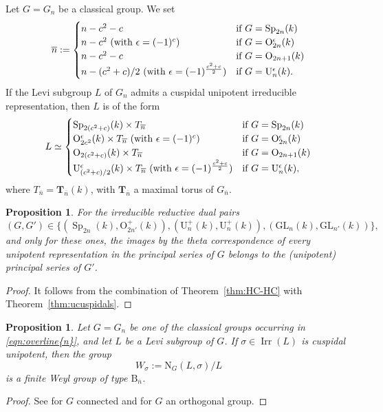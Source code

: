 \documentclass[12pt]{amsart}
\numberwithin{equation}{subsection}
\newtheorem{prop}[equation]{Proposition}
\newcommand{\rU}{\mathrm{U}}
\newcommand{\bT}{\mathbf{T}}
\newcommand{\Irr}{\operatorname{Irr}}
\newcommand{\rN}{{\mathrm{N}}}
\newcommand{\GL}{\mathrm{GL}}
\newcommand{\Sp}{\operatorname{Sp}}
\def\rO{{\mathrm{O}}}
\def\rB{{\mathrm{B}}}
\begin{document}
Let $G=G_n$ be a classical group. We set
\begin{equation} \label{eqn:overline{n}}
\overline{n}:=
\begin{cases}
n-c^2-c&\text{if $G=\Sp_{2n}(k)$}\cr
n-c^2 \text{ (with $\epsilon=(-1)^c$)}&\text{if $G=\rO_{2n}^\epsilon(k)$}\cr
n-c^2-c&\text{if $G=\rO_{2n+1}(k)$}\cr
n-(c^2+c)/2 \text{ (with $\epsilon=(-1)^{\frac{c^2+c}{2}}$)} &\text{if $G=\rU_{n}^\epsilon(k)$}.
\end{cases} 
\end{equation}
If the Levi subgroup $L$ of $G_n$ admits a cuspidal unipotent irreducible representation, then $L$ is of the form
\begin{equation} \label{eqn:Levi-form}
L\simeq
\begin{cases}
\Sp_{2(c^2+c)}(k)\times T_{\overline{n}}&\text{if $G=\Sp_{2n}(k)$}\cr
\rO^\epsilon_{2c^2}(k)\times T_{\overline{n}} \text{ (with $\epsilon=(-1)^c$)}&\text{if $G=\rO_{2n}^\epsilon(k)$}\cr
\rO_{2(c^2+c)}(k)\times T_{\overline{n}}&\text{if $G=\rO_{2n+1}(k)$}\cr
\rU^\epsilon_{(c^2+c)/2}(k)\times T_{\overline{n}}\text{ (with $\epsilon=(-1)^{\frac{c^2+c}{2}}$)} &\text{if $G=\rU^\epsilon_{n}(k)$},
\end{cases} 
\end{equation}
where $T_{\overline{n}}=\bT_{\overline{n}}(k)$, with $\bT_{\overline{n}}$ a maximal torus of $G_{\overline{n}}$.

\begin{prop} \label{pro:principal-unipotent}
For the  irreducible reductive dual pairs 
\[(G,G')\in\{(\Sp_{2n}(k),\rO_{2n'}^+(k)),(\rU_{n}^+(k),\rU_{n}^+(k)),(\GL_n(k),\GL_{n'}(k))\},\] 
and only for these ones,  the images by the theta correspondence of every unipotent representation in the principal series of $G$ belongs to the (unipotent) principal series of $G'$.
\end{prop}
\begin{proof}
It follows from the combination of Theorem~\ref{thm:HC-HC} with Theorem~\ref{thm:ucuspidals}.
\end{proof}

\begin{prop} \label{prop:B}
Let $G=G_n$ be one of the classical groups occurring in \eqref{eqn:overline{n}}, and let $L$ be a Levi subgroup of $G$.
If $\sigma\in\Irr(L)$ is  cuspidal unipotent, then the group 
\begin{equation} \label{eqn:W}
W_{\sigma}:=\rN_{G}(L,\sigma)/L
\end{equation} 
is a finite Weyl group of type $\rB_{\overline{n}}$.
\end{prop}
\begin{proof}
See \cite{LusMadison} for $G$ connected and \cite[Lemme~3.2]{AMR} for $G$ an orthogonal group.
\end{proof}
\end{document}
